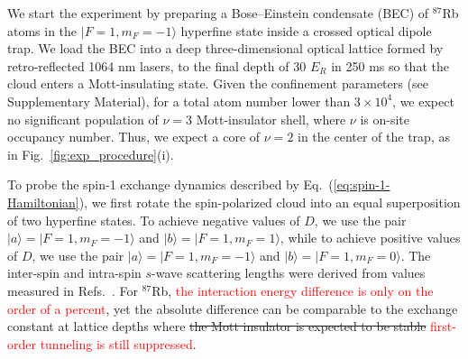 \documentclass[aps,prl,twocolumn,superscriptaddress]{revtex4-1}
\newcommand{\newmat}[1]{\textcolor{red}{#1}}
\newcommand{\rmtxt}[1]{\st{#1}}
\begin{document}
We start the experiment by preparing a Bose--Einstein condensate (BEC) of $^{87}$Rb atoms in the $|F=1,m_F = -1\rangle$ hyperfine state inside a crossed optical dipole trap. We load the BEC into a deep three-dimensional optical lattice formed by retro-reflected 1064 nm lasers, to the final depth of 30 $E_R$ in 250 ms so that the cloud enters a Mott-insulating state. Given the confinement parameters (see Supplementary Material), for a total atom number lower than $3\times 10^{4}$, we expect no significant population of $\nu=3$ Mott-insulator shell, where $\nu$ is on-site occupancy number. Thus, we expect a core of $\nu=2$ in the center of the trap, as in Fig.~\ref{fig:exp_procedure}(i).

To probe the spin-1 exchange dynamics described by Eq.~(\ref{eq:spin-1-Hamiltonian}), we first rotate the spin-polarized cloud into an equal superposition of two hyperfine states. To achieve negative values of $D$, we use the pair $|a\rangle = |F=1,m_F=-1\rangle$ and $|b\rangle = |F=1,m_F=1\rangle$, while to achieve positive values of $D$, we use the pair $|a\rangle = |F=1,m_F=-1\rangle$ and $|b\rangle = |F=1,m_F=0\rangle$. The inter-spin and intra-spin $s$-wave scattering lengths were derived from values measured in Refs.~\cite{Mitchell2019,Egorov2013,Eto2018}. For $^{87}$Rb, \newmat{the interaction energy difference is only on the order of a percent}, yet the absolute difference can be comparable to the exchange constant at lattice depths where \rmtxt{the Mott insulator is expected to be stable} \newmat{first-order tunneling is still suppressed}.
\end{document}
